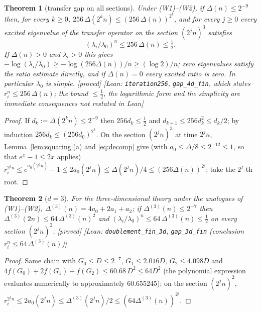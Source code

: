 \documentclass[11pt,a4paper]{article}
\theoremstyle{plain}
\newtheorem{theorem}{Theorem}[section]
\theoremstyle{definition}
\theoremstyle{remark}
\numberwithin{equation}{section}
\newcommand{\st}[1]{\textsf{[#1]}}
\begin{document}
\begin{theorem}[transfer gap on all sections]\label{thm:lattice}
Under (W1)--(W2), if $\Delta(n)\le2^{-9}$ then, for every $k\ge0$, $256\,\Delta(2^kn)\le(256\,\Delta(n))^{2^k}$, and for every $j\ge0$
every excited eigenvalue of the transfer operator on the section $(2^jn)^3$ satisfies
\begin{equation}\label{eq:gap}
(\lambda_i/\lambda_0)^n\le256\,\Delta(n)\le\tfrac12.
\end{equation}
If $\Delta(n)>0$ and $\lambda_i>0$ this gives $-\log(\lambda_i/\lambda_0)\ge-\log(256\Delta(n))/n\ge(\log2)/n$; zero eigenvalues satisfy the ratio
estimate directly, and if $\Delta(n)=0$ every excited ratio is zero. In particular $\lambda_0$ is simple. \st{proved} \st{Lean:
\texttt{iteration256}, \texttt{gap\_4d\_fin}, which states $r_i^n\le256\,\Delta(n)$; the bound $\le\frac12$, the logarithmic form and the
simplicity are immediate consequences not restated in Lean}
\end{theorem}
\begin{proof}
If $d_k:=\Delta(2^kn)\le2^{-9}$ then $256d_k\le\frac12$ and $d_{k+1}\le256d_k^2\le d_k/2$; by induction $256d_k\le(256d_0)^{2^k}$. On the
section $(2^jn)^3$ at time $2^jn$, Lemma~\ref{lem:squaring}(a) and \eqref{eq:decomp} give (with $a_0\le\Delta/8\le2^{-12}\le1$, so that $e^x-1\le2x$ applies) $r_i^{2^jn}\le e^{a_0(2^jn)}-1\le2a_0(2^jn)\le
\Delta(2^jn)/4\le(256\Delta(n))^{2^j}$; take the $2^j$-th root.
\end{proof}

\begin{theorem}[$d=3$]\label{thm:3d}
For the three-dimensional theory under the analogues of (W1)--(W2), $\Delta^{(3)}(n)=4a_0+2a_1+a_2$; if $\Delta^{(3)}(n)\le2^{-7}$ then
$\Delta^{(3)}(2n)\le64\,\Delta^{(3)}(n)^2$ and $(\lambda_i/\lambda_0)^n\le64\,\Delta^{(3)}(n)\le\frac12$ on every section $(2^jn)^2$.
\st{proved} \st{Lean: \texttt{doublement\_fin\_3d}, \texttt{gap\_3d\_fin} (conclusion $r_i^n\le64\,\Delta^{(3)}(n)$)}
\end{theorem}
\begin{proof}
Same chain with $G_0\le D\le2^{-7}$, $G_1\le2.016D$, $G_2\le4.098D$ and $4f(G_0)+2f(G_1)+f(G_2)\le60.68\,D^2\le64D^2$ (the polynomial expression evaluates numerically to approximately $60.655245$); on the section $(2^jn)^2$, $r_i^{2^jn}\le2a_0(2^jn)\le\Delta^{(3)}(2^jn)/2\le(64\Delta^{(3)}(n))^{2^j}$.
\end{proof}
\end{document}
